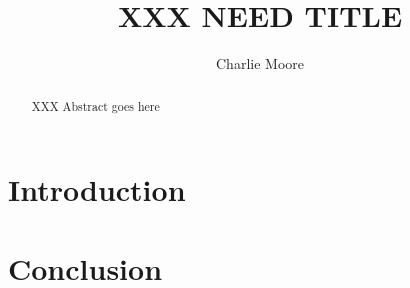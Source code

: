 \documentclass{acm_proc_article-sp}
\author{
\alignauthor
Charlie Moore\\
\email{cmoore@nmt.edu}
}
\title{XXX NEED TITLE}
\begin{document}
\maketitle
\begin{abstract}
XXX Abstract goes here
\end{abstract}


\section{Introduction}



\section{Conclusion}




%
\balancecolumns
\end{document}
